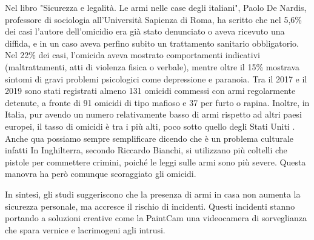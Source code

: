 \documentclass[12pt]{book} %
\begin{document}
\begin{mdframed}[linewidth=1pt]
Nel libro "Sicurezza e legalità. Le armi nelle case degli italiani", Paolo De Nardis, professore di sociologia all'Università Sapienza di Roma, ha scritto che nel 5,6\% dei casi l’autore dell’omicidio era già stato denunciato o aveva ricevuto una diffida, e in un caso aveva perfino subito un trattamento sanitario obbligatorio. Nel 22\% dei casi, l’omicida aveva mostrato comportamenti indicativi (maltrattamenti, atti di violenza fisica o verbale), mentre oltre il 15\% mostrava sintomi di gravi problemi psicologici come depressione e paranoia. Tra il 2017 e il 2019 sono stati registrati almeno 131 omicidi commessi con armi regolarmente detenute, a fronte di 91 omicidi di tipo mafioso e 37 per furto o rapina. Inoltre, in Italia, pur avendo un numero relativamente basso di armi rispetto ad altri paesi europei, il tasso di omicidi è tra i più alti, poco sotto quello degli Stati Uniti .
Anche qua possiamo sempre semplificare dicendo che è un problema culturale infatti In Inghilterra, secondo Riccardo Bianchi, si utilizzano più coltelli che pistole per commettere crimini, poiché le leggi sulle armi sono più severe. Questa manovra ha però comunque scoraggiato gli omicidi.

In sintesi, gli studi suggeriscono che la presenza di armi in casa non aumenta la sicurezza personale, ma accresce il rischio di incidenti. Questi incidenti stanno portando a soluzioni creative come la PaintCam una videocamera di sorveglianza che spara vernice e lacrimogeni agli intrusi.
\end{mdframed}

\bigskip
\end{document}
